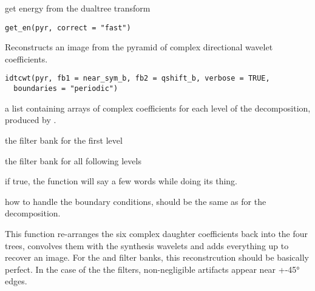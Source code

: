 \documentclass[a4paper]{book}
\begin{document}
%
\begin{Description}\relax
get energy from the dualtree transform
\end{Description}
%
\begin{Usage}
\begin{verbatim}
get_en(pyr, correct = "fast")
\end{verbatim}
\end{Usage}
%
\begin{Description}\relax
Reconstructs an image from the pyramid of complex directional wavelet coefficients.
\end{Description}
%
\begin{Usage}
\begin{verbatim}
idtcwt(pyr, fb1 = near_sym_b, fb2 = qshift_b, verbose = TRUE,
  boundaries = "periodic")
\end{verbatim}
\end{Usage}
%
\begin{Arguments}
\begin{ldescription}
\item[\code{pyr}] a list containing arrays of complex coefficients for each level of the decomposition, produced by .

\item[\code{fb1}] the filter bank for the first level

\item[\code{fb2}] the filter bank for all following levels

\item[\code{verbose}] if true, the function will say a few words while doing its thing.

\item[\code{boundaries}] how to handle the boundary conditions, should be the same as for the decomposition.
\end{ldescription}
\end{Arguments}
%
\begin{Details}\relax
This function re-arranges the six complex daughter coefficients back into the four trees, convolves them with the synthesis wavelets and adds everything up to recover an image. For the  and  filter banks, this reconstrcution should be basically perfect. In the case of the the  filters, non-negligible artifacts appear near +-45° edges.
\end{Details}
\end{document}
